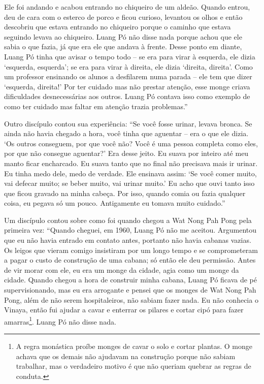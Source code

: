 Ele foi andando e acabou entrando no chiqueiro de um aldeão. Quando
entrou, deu de cara com o esterco de porco e ficou curioso, levantou os
olhos e então descobriu que estava entrando no chiqueiro porque o
caminho que estava seguindo levava ao chiqueiro. Luang Pó não disse nada
porque achou que ele sabia o que fazia, já que era ele que andava à
frente. Desse ponto em diante, Luang Pó tinha que avisar o tempo todo --
se era para virar à esquerda, ele dizia `esquerda, esquerda'; se era
para virar à direita, ele dizia `direita, direita'. Como um professor
ensinando os alunos a desfilarem numa parada -- ele tem que dizer
`esquerda, direita!' Por ter cuidado mas não prestar atenção, esse monge
criava dificuldades desnecessárias aos outros. Luang Pó contava isso
como exemplo de como ter cuidado mas faltar em atenção trazia
problemas.''

Outro discípulo contou sua experiência: ``Se você fosse urinar, levava
bronca. Se ainda não havia chegado a hora, você tinha que aguentar --
era o que ele dizia. `Os outros conseguem, por que você não? Você é uma
pessoa completa como eles, por que não consegue aguentar?' Era desse
jeito. Eu suava por inteiro até meu manto ficar encharcado. Eu suava
tanto que no final não precisava mais ir urinar. Eu tinha medo dele,
medo de verdade. Ele ensinava assim: `Se você comer muito, vai defecar
muito; se beber muito, vai urinar muito.' Eu acho que ouvi tanto isso
que ficou gravado na minha cabeça. Por isso, quando comia ou fazia
qualquer coisa, eu pegava só um pouco. Antigamente eu tomava muito
cuidado.''

Um discípulo contou sobre como foi quando chegou a Wat Nong Pah Pong
pela primeira vez: ``Quando cheguei, em 1960, Luang Pó não me aceitou.
Argumentou que eu não havia entrado em contato antes, portanto não havia
cabanas vazias. Os leigos que vieram comigo insistiram por um longo
tempo e se comprometeram a pagar o custo de construção de uma cabana; só
então ele deu permissão. Antes de vir morar com ele, eu era um monge da
cidade, agia como um monge da cidade. Quando chegou a hora de construir
minha cabana, Luang Pó ficava de pé supervisionando, mas eu era
arrogante e pensei que os monges de Wat Nong Pah Pong, além de não serem
hospitaleiros, não sabiam fazer nada. Eu não conhecia o Vinaya, então
fui ajudar a cavar e enterrar os pilares e cortar cipó para fazer
amarras\footnote{A regra monástica proíbe monges de cavar o solo e
  cortar plantas. O monge achava que os demais não ajudavam na
  construção porque não sabiam trabalhar, mas o verdadeiro motivo é que
  não queriam quebrar as regras de conduta.}. Luang Pó não disse nada.

